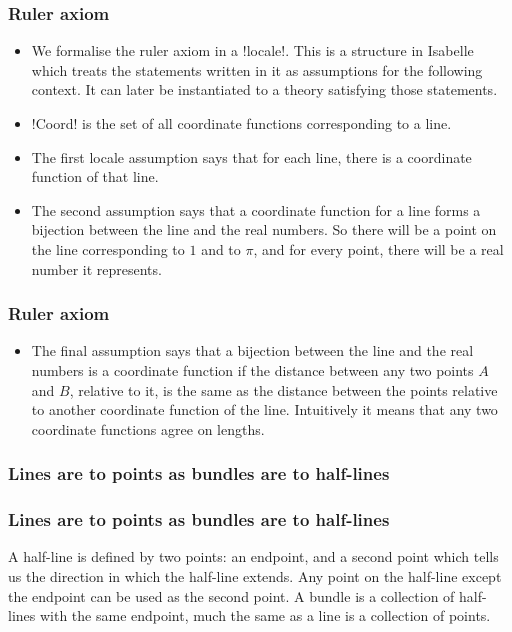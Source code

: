 \documentclass{beamer}
\begin{document}
\begin{frame}
\frametitle{Ruler axiom}
\begin{itemize}
\item We formalise the ruler axiom in a \Icode!locale!. This is a structure in Isabelle which treats the statements written in it as assumptions for the following context. It can later be instantiated to a theory satisfying those statements. 
\item \Icode!Coord! is the set of all coordinate functions corresponding to a line.
\item The first locale assumption says that for each line, there is a coordinate function of that line.
\item The second assumption says that a coordinate function for a line forms a bijection between the line and the real numbers. So there will be a point on the line corresponding to $1$ and to $\pi$, and for every point, there will be a real number it represents.
\end{itemize}
\end{frame}

\begin{frame}
\frametitle{Ruler axiom}
\begin{itemize}
\item The final assumption says that a bijection between the line and the real numbers is a coordinate function if the distance between any two points $A$ and $B$, relative to it, is the same as the distance between the points relative to another coordinate function of the line. Intuitively it means that any two coordinate functions agree on lengths.
\end{itemize}
\end{frame}

{\graphicspath{{/Users/Imogen/Desktop/Birkhoff_Presentation/}}
\begin{frame}
\frametitle{Lines are to points as bundles are to half-lines}

\end{frame}}
\begin{frame}
\frametitle{Lines are to points as bundles are to half-lines}
 A half-line is defined by two points: an endpoint, and a second point which tells us the direction in which the half-line extends. Any point on the half-line except the endpoint can be used as the second point. A bundle is a collection of half-lines with the same endpoint, much the same as a line is a collection of points.
\end{frame}
\end{document}
